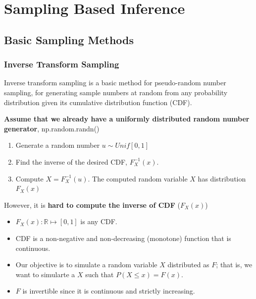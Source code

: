 \chapter{Sampling Based Inference}
\section{Basic Sampling Methods}

\subsection{Inverse Transform Sampling}
Inverse transform sampling is a basic method for pseudo-random number sampling, \ie for generating sample numbers at random from any probability distribution given its cumulative distribution function (CDF).

\textbf{Assume that we already have a uniformly distributed random number generator}, \eg \textrm{np.random.randn()}
\begin{enumerate}
	\item Generate a random number $u \sim Unif[0,1]$
	\item Find the inverse of the desired CDF, $F_{X}^{-1}(x)$.
	\item Compute $X=F_{X}^{-1}(u)$. The computed random variable $X$ has distribution $F_X(x)$
\end{enumerate}
However, it is \textbf{hard to compute the inverse of CDF} ($F_X(x)$)

	\begin{itemize}
		\item $F_X(x):\mathbb{R}\mapsto [0,1]$ is any CDF. 
		\item CDF is a non-negative and non-decreasing (monotone) function that is continuous. 
		\item Our objective is to simulate a random variable $X$ distributed as $F$; that is, we want to simularte a $X$ such that $P(X\leq x)=F(x)$.
		\item $F$ is invertible since it is continuous and strictly increasing.
	\end{itemize}

